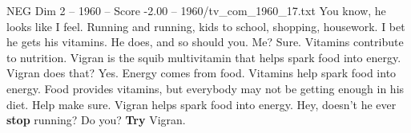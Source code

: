 \begin{textsample}{NEG Dim 2 – 1960 – Score -2.00 – 1960/tv\_com\_1960\_17.txt}  \label{ex:f2_neg_074}
You know, he looks like I feel.
Running and running, kids to school, shopping, housework.
I bet he gets his vitamins.
He does, and so should you.
Me?
Sure.
Vitamins contribute to nutrition.
Vigran is the squib multivitamin that helps spark food into energy.
Vigran does that?
Yes.
Energy comes from food.
Vitamins help spark food into energy.
Food provides vitamins, but everybody may not be getting enough in his diet.
Help make sure.
Vigran helps spark food into energy.
Hey, doesn't he ever \textbf{stop} running?
Do you? \textbf{Try} Vigran.

\end{textsample}
